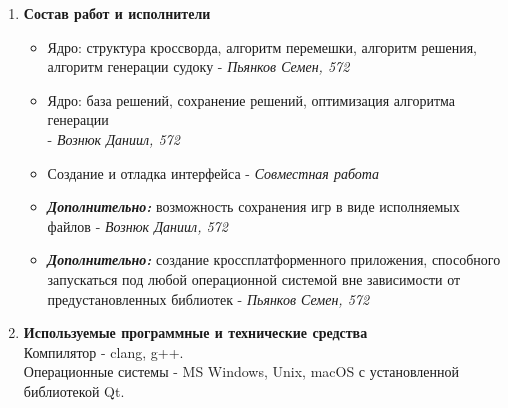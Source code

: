 \documentclass[12pt]{article}
\begin{document}
\begin{enumerate}
\item \textbf{Состав работ и исполнители} 
\begin{itemize}
    \item Ядро: структура кроссворда, алгоритм перемешки, алгоритм решения, алгоритм генерации судоку - \textit{Пьянков Семен, 572}
    \item Ядро: база решений, сохранение решений, оптимизация алгоритма генерации\\ - \textit{Вознюк Даниил, 572}
    \item Создание и отладка интерфейса - \textit{Совместная работа}
    \item \textbf{\textit{Дополнительно:}} возможность сохранения игр в виде исполняемых файлов - \textit{Вознюк Даниил, 572}
    \item \textbf{\textit{Дополнительно:}} создание кроссплатформенного приложения, способного запускаться под любой операционной системой вне зависимости от предустановленных библиотек - \textit{Пьянков Семен, 572}
\end{itemize}

\item \textbf{Используемые программные и технические средства} \\
Компилятор - clang, g++.\\
Операционные системы - MS Windows, Unix, macOS с установленной библиотекой Qt.

\end{enumerate}
\end{document}

